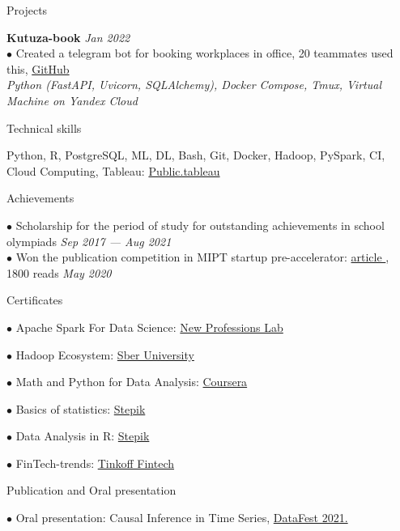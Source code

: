\documentclass{resume} %
\begin{document}
\begin{rSection}{ Projects }

    { \bf Kutuza-book} \hfill {\em Jan 2022}\\
    { $\bullet$ Created a telegram bot for booking workplaces in office, 20 teammates used this, \href{https://github.com/YHx07/Kutuza-book}{GitHub}}\\
    { \it Python (FastAPI, Uvicorn, SQLAlchemy), Docker Compose, Tmux, Virtual Machine on Yandex Cloud }
    
\end{rSection}
    
\begin{rSection}{ Technical skills }
    
    Python, R, PostgreSQL, ML, DL, Bash, Git, Docker, Hadoop, PySpark, CI, Cloud Computing, Tableau: \href{https://public.tableau.com/profile/dmitriy5983#!/}{Public.tableau}

\end{rSection}

\begin{rSection}{ Achievements }

    { $\bullet$ Scholarship for the period of study for outstanding achievements in school olympiads } \hfill {\em Sep 2017 — Aug 2021}\\
    { $\bullet$ Won the publication competition in MIPT startup pre-accelerator: \href{https://vc.ru/tribuna/125433-kak-my-hoteli-pomoch-taksistam-no-pandemiya-vse-isportila}{ article }, 1800 reads }\hfill {\em May 2020}

\end{rSection}

\begin{rSection}{ Certificates }
    
    \noindent
    \begin{multicols}{2}[]
    
    $\bullet$ Apache Spark For Data Science: \href{https://drive.google.com/file/d/1evNnhppurXyzoJdDQp115oRHAtRayW5c/view?usp=sharing}{New Professions Lab} 
    
    $\bullet$ Hadoop Ecosystem: \href{https://drive.google.com/file/d/1oKQetSzr_RCyxpTdWmbY30uNEQGlxMRn/view?usp=sharing}{Sber University}
    
    $\bullet$ Math and Python for Data Analysis: \href{https://coursera.org/share/bbccb26f066e4ed7ca05c52754b15976}{Coursera} 
    
    $\bullet$ Basics of statistics: \href{https://stepik.org/cert/258802}{Stepik}

    $\bullet$ Data Analysis in R: \href{https://stepik.org/cert/744648}{Stepik}
    
    $\bullet$ FinTech-trends: \href{https://drive.google.com/file/d/1kws8qPbbTlbQyyTZY5I2eY6o37Grdccv/view?usp=sharing}{Tinkoff Fintech}
    
    \end{multicols}

\end{rSection}

\begin{rSection}{ Publication and Oral presentation }

    { $\bullet$ Oral presentation: Causal Inference in Time Series, \href{https://youtu.be/Yr6b8Rpy7Ds}{DataFest 2021. }}\\
    
\end{rSection}
\end{document}
